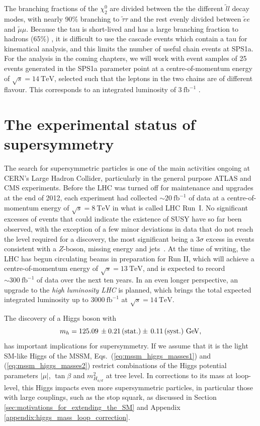 \documentclass[twoside,english]{uiofysmaster}
\begin{document}
The branching fractions of the $\chi_2^0$ are divided between the the different $\tilde l l$ decay modes, with nearly 90\% branching to $\tilde \tau \tau$ and the rest evenly divided between $\tilde e e$ and $\tilde \mu \mu$. Because the tau is short-lived and has a large branching fraction to hadrons (65\%) \cite{Agashe:2014kda}, it is difficult to use the cascade events which contain a tau for kinematical analysis, and this limits the number of useful chain events at SPS1a. For the analysis in the coming chapters, we will work with event samples of 25 events generated in the SPS1a parameter point at a centre-of-momentum energy of $\sqrt{s}= 14~\mathrm{TeV}$, selected such that the leptons in the two chains are of different flavour. This corresponds to an integrated luminosity of $3~\mathrm{fb}^{-1}$ \cite{Webber:2009vm}.

\section{The experimental status of supersymmetry}
The search for supersymmetric particles is one of the main activities ongoing at CERN's Large Hadron Collider, particularly in the general purpose ATLAS and CMS experiments. Before the LHC was turned off for maintenance and upgrades at the end of 2012, each experiment had collected $\sim 20 ~\mathrm{fb}^{-1}$ of data at a centre-of-momentum energy of $\sqrt{s} = 8~\mathrm{TeV}$ in what is called LHC Run~I. No significant excesses of events that could indicate the existence of SUSY have so far been observed, with the exception of a few minor deviations in data that do not reach the level required for a discovery, the most significant being a $3\sigma$ excess in events consistent with a $Z$-boson, missing energy and jets~\cite{Aad:2015wqa}. At the time of writing, the LHC has begun circulating beams in preparation for Run II, which will achieve a centre-of-momentum energy of $\sqrt{s} = 13~\mathrm{TeV}$, and is expected to record $\sim 300 ~\mathrm{fb}^{-1}$ of data over the next ten years. In an even longer perspective, an upgrade to the {\it high luminosity LHC} is planned, which brings the total expected integrated luminosity up to $3000~\mathrm{fb}^{-1}$ at $\sqrt{s} = 14~\mathrm{TeV}$. 

The discovery of a Higgs boson with~\cite{Aad:2015zhl}
\begin{equation}
m_h = 125.09\,\pm 0.21\, (\rm{stat.})\pm\, 0.11\, (\rm{syst.})~{\rm GeV,}
\label{eq:higgsmass}
\end{equation}
has important implications for supersymmetry. If we assume that it is the light SM-like Higgs of the MSSM, Eqs.\ (\ref{eq:mssm_higgs_masses1}) and (\ref{eq:mssm_higgs_masses2}) restrict combinations of the Higgs potential parameters $|\mu|$, $\tan\beta$ and $m^2_{H_{u/d}}$ at tree level. In corrections to its mass at loop-level, this Higgs impacts even more supersymmetric particles, in particular those with large couplings, such as the stop squark, as discussed in Section \ref{sec:motivations_for_extending_the_SM} and Appendix \ref{appendix:higgs_mass_loop_correction}.
\end{document}
